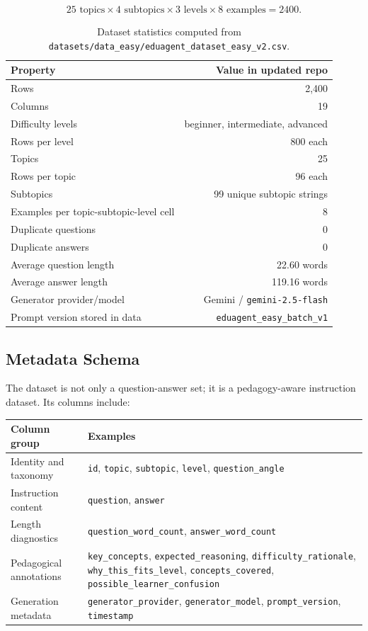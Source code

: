 \documentclass[11pt,a4paper]{article}
\begin{document}
\[
25 \text{ topics} \times 4 \text{ subtopics} \times 3 \text{ levels} \times 8 \text{ examples} = 2400.
\]

\begin{table}[H]
\centering
\begin{tabular}{l r}
\toprule
\textbf{Property} & \textbf{Value in updated repo} \\
\midrule
Rows & 2,400 \\
Columns & 19 \\
Difficulty levels & beginner, intermediate, advanced \\
Rows per level & 800 each \\
Topics & 25 \\
Rows per topic & 96 each \\
Subtopics & 99 unique subtopic strings \\
Examples per topic-subtopic-level cell & 8 \\
Duplicate questions & 0 \\
Duplicate answers & 0 \\
Average question length & 22.60 words \\
Average answer length & 119.16 words \\
Generator provider/model & Gemini / \texttt{gemini-2.5-flash} \\
Prompt version stored in data & \texttt{eduagent\_easy\_batch\_v1} \\
\bottomrule
\end{tabular}
\caption{Dataset statistics computed from \texttt{datasets/data\_easy/eduagent\_dataset\_easy\_v2.csv}.}
\end{table}

\subsection{Metadata Schema}

The dataset is not only a question-answer set; it is a pedagogy-aware instruction dataset. Its columns include:

\begin{center}
\small
\begin{tabular}{p{}p{}}
\toprule
\textbf{Column group} & \textbf{Examples} \\
\midrule
Identity and taxonomy & \texttt{id}, \texttt{topic}, \texttt{subtopic}, \texttt{level}, \texttt{question\_angle} \\
Instruction content & \texttt{question}, \texttt{answer} \\
Length diagnostics & \texttt{question\_word\_count}, \texttt{answer\_word\_count} \\
Pedagogical annotations & \texttt{key\_concepts}, \texttt{expected\_reasoning}, \texttt{difficulty\_rationale}, \texttt{why\_this\_fits\_level}, \texttt{concepts\_covered}, \texttt{possible\_learner\_confusion} \\
Generation metadata & \texttt{generator\_provider}, \texttt{generator\_model}, \texttt{prompt\_version}, \texttt{timestamp} \\
\bottomrule
\end{tabular}
\end{center}
\end{document}
